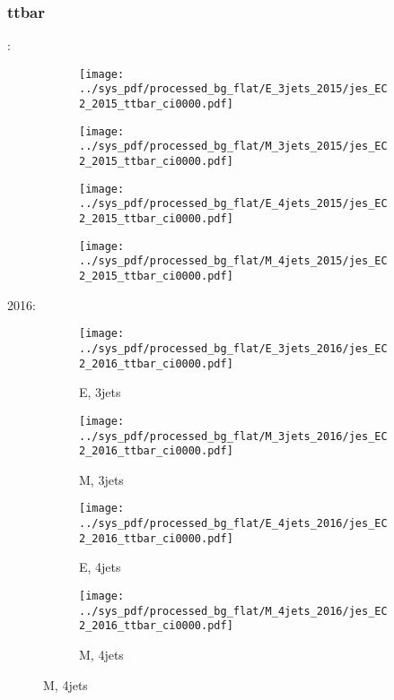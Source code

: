 \documentclass{beamer}
\begin{document}
\begin{frame}
\frametitle{ttbar}
\fontsize{5}{1}:
\begin{figure}
\centering
\begin{subfigure}[b]{0.24\textwidth}
\texttt{[image: ../sys\_pdf/processed\_bg\_flat/E\_3jets\_2015/jes\_EC2\_2015\_ttbar\_ci0000.pdf]}
\end{subfigure}
\begin{subfigure}[b]{0.24\textwidth}
\texttt{[image: ../sys\_pdf/processed\_bg\_flat/M\_3jets\_2015/jes\_EC2\_2015\_ttbar\_ci0000.pdf]}
\end{subfigure}
\begin{subfigure}[b]{0.24\textwidth}
\texttt{[image: ../sys\_pdf/processed\_bg\_flat/E\_4jets\_2015/jes\_EC2\_2015\_ttbar\_ci0000.pdf]}
\end{subfigure}
\begin{subfigure}[b]{0.24\textwidth}
\texttt{[image: ../sys\_pdf/processed\_bg\_flat/M\_4jets\_2015/jes\_EC2\_2015\_ttbar\_ci0000.pdf]}
\end{subfigure}
\end{figure}
2016:
\begin{figure}
\centering
\begin{subfigure}[b]{0.24\textwidth}
\texttt{[image: ../sys\_pdf/processed\_bg\_flat/E\_3jets\_2016/jes\_EC2\_2016\_ttbar\_ci0000.pdf]}
\captionsetup{font=tiny}
\caption{E, 3jets}
\end{subfigure}
\begin{subfigure}[b]{0.24\textwidth}
\texttt{[image: ../sys\_pdf/processed\_bg\_flat/M\_3jets\_2016/jes\_EC2\_2016\_ttbar\_ci0000.pdf]}
\captionsetup{font=tiny}
\caption{M, 3jets}
\end{subfigure}
\begin{subfigure}[b]{0.24\textwidth}
\texttt{[image: ../sys\_pdf/processed\_bg\_flat/E\_4jets\_2016/jes\_EC2\_2016\_ttbar\_ci0000.pdf]}
\captionsetup{font=tiny}
\caption{E, 4jets}
\end{subfigure}
\begin{subfigure}[b]{0.24\textwidth}
\texttt{[image: ../sys\_pdf/processed\_bg\_flat/M\_4jets\_2016/jes\_EC2\_2016\_ttbar\_ci0000.pdf]}
\captionsetup{font=tiny}
\caption{M, 4jets}
\end{subfigure}
\end{figure}
\end{frame}
\end{document}

